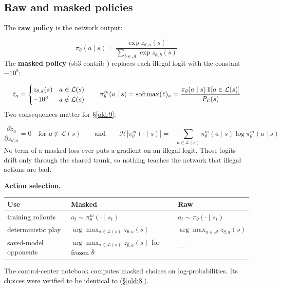 \subsection{Raw and masked policies}\label{old:3.2}

The \textbf{raw policy} is the network output:

\[
\pi_\theta(a \mid s) = \frac{\exp z_{\theta,a}(s)}{\sum_{b \in \mathcal{A}} \exp z_{\theta,b}(s)}
\]
The \textbf{masked policy} (sb3-contrib ) replaces each illegal logit with the constant $-10^{8}$:

\[
\tilde z_a = \begin{cases} z_{\theta,a}(s) & a \in \mathcal{L}(s) \\ -10^{8} & a \notin \mathcal{L}(s) \end{cases}
\qquad
\pi^{m}_\theta(a \mid s) = \operatorname{softmax}(\tilde z)_a = \frac{\pi_\theta(a \mid s)\,\mathbf{1}[a \in \mathcal{L}(s)]}{P_{\mathcal{L}}(s)}
\]
Two consequences matter for \S\ref{old:9}:

\[
\frac{\partial \tilde z_a}{\partial z_{\theta,a}} = 0 \quad \text{for } a \notin \mathcal{L}(s)
\qquad\text{and}\qquad
\mathcal{H}\big[\pi^m_\theta(\cdot \mid s)\big] = -\sum_{a \in \mathcal{L}(s)} \pi^m_\theta(a \mid s) \log \pi^m_\theta(a \mid s)
\]
No term of a masked loss ever puts a gradient on an illegal logit. Those logits drift only through the shared trunk, so nothing teaches the network that illegal actions are bad.

\textbf{Action selection.}

{\small
\begin{longtable}{@{}>{\raggedright\arraybackslash}p{}>{\raggedright\arraybackslash}p{}>{\raggedright\arraybackslash}p{}@{}}
\toprule
\textbf{Use} & \textbf{Masked} & \textbf{Raw} \\
\midrule
\endhead
training rollouts & $a_t \sim \pi^m_\theta(\cdot \mid s_t)$ & $a_t \sim \pi_\theta(\cdot \mid s_t)$ \\
deterministic play & $\arg\max_{a \in \mathcal{L}(s)} z_{\theta,a}(s)$ & $\arg\max_{a \in \mathcal{A}} z_{\theta,a}(s)$ \\
saved-model opponents & $\arg\max_{a \in \mathcal{L}(s)} z_{\bar\theta,a}(s)$ for frozen $\bar\theta$ & — \\
\bottomrule
\end{longtable}\addtocounter{table}{-1}
}

The control-center notebook computes masked choices on log-probabilities. Its choices were verified to be identical to  (\S\ref{old:8}).

